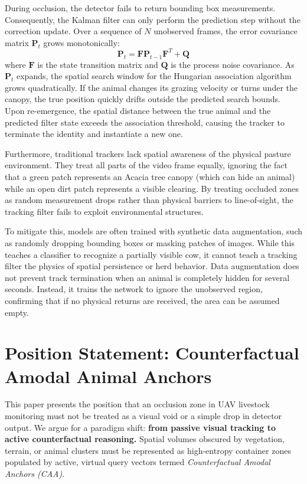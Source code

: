 \documentclass[10pt,conference,letterpaper,twocolumn]{article}
\begin{document}
During occlusion, the detector fails to return bounding box measurements. Consequently, the Kalman filter can only perform the prediction step without the correction update. Over a sequence of $N$ unobserved frames, the error covariance matrix $\mathbf{P}_t$ grows monotonically:
\begin{equation}
\mathbf{P}_t = \mathbf{F} \mathbf{P}_{t-1} \mathbf{F}^T + \mathbf{Q}
\end{equation}
where $\mathbf{F}$ is the state transition matrix and $\mathbf{Q}$ is the process noise covariance. As $\mathbf{P}_t$ expands, the spatial search window for the Hungarian association algorithm grows quadratically. If the animal changes its grazing velocity or turns under the canopy, the true position quickly drifts outside the predicted search bounds. Upon re-emergence, the spatial distance between the true animal and the predicted filter state exceeds the association threshold, causing the tracker to terminate the identity and instantiate a new one.

Furthermore, traditional trackers lack spatial awareness of the physical pasture environment. They treat all parts of the video frame equally, ignoring the fact that a green patch represents an Acacia tree canopy (which can hide an animal) while an open dirt patch represents a visible clearing. By treating occluded zones as random measurement drops rather than physical barriers to line-of-sight, the tracking filter fails to exploit environmental structures.

To mitigate this, models are often trained with synthetic data augmentation, such as randomly dropping bounding boxes or masking patches of images. While this teaches a classifier to recognize a partially visible cow, it cannot teach a tracking filter the physics of spatial persistence or herd behavior. Data augmentation does not prevent track termination when an animal is completely hidden for several seconds. Instead, it trains the network to ignore the unobserved region, confirming that if no physical returns are received, the area can be assumed empty.

\section{Position Statement: Counterfactual Amodal Animal Anchors}
This paper presents the position that an occlusion zone in UAV livestock monitoring must not be treated as a visual void or a simple drop in detector output. We argue for a paradigm shift: \textbf{from passive visual tracking to active counterfactual reasoning.} Spatial volumes obscured by vegetation, terrain, or animal clusters must be represented as high-entropy container zones populated by active, virtual query vectors termed \textit{Counterfactual Amodal Anchors (CAA)}.
\end{document}
